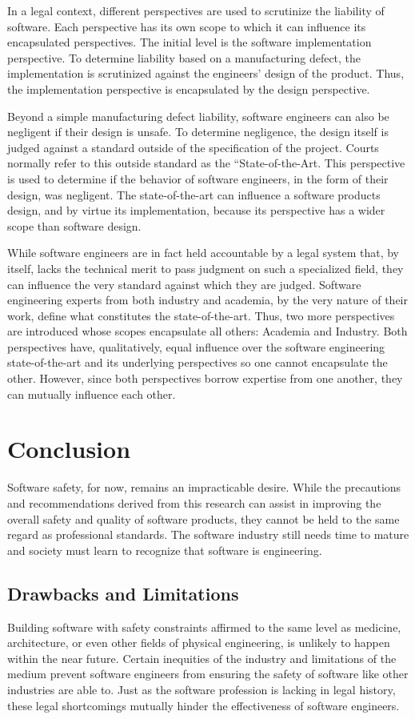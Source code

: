 \documentclass[12pt]{report}
\begin{document}
In a legal context, different perspectives are used to scrutinize the liability of software. Each perspective has its own scope to which it can influence its encapsulated perspectives. The initial level is the software implementation perspective. To determine liability based on a manufacturing defect, the implementation is scrutinized against the engineers' design of the product. Thus, the implementation perspective is encapsulated by the design perspective. 

Beyond a simple manufacturing defect liability, software engineers can also be negligent if their design is unsafe. To determine negligence, the design itself is judged against a standard outside of the specification of the project. Courts normally refer to this outside standard as the ``State-of-the-Art. This perspective is used to determine if the behavior of software engineers, in the form of their design, was negligent. The state-of-the-art can influence a software products design, and by virtue its implementation, because its perspective has a wider scope than software design. 

While software engineers are in fact held accountable by a legal system that, by itself, lacks the technical merit to pass judgment on such a specialized field, they can influence the very standard against which they are judged. Software engineering experts from both industry and academia, by the very nature of their work, define what constitutes the state-of-the-art. Thus, two more perspectives are introduced whose scopes encapsulate all others: Academia and Industry. Both perspectives have, qualitatively, equal influence over the software engineering state-of-the-art and its underlying perspectives so one cannot encapsulate the other. However, since both perspectives borrow expertise from one another, they can mutually influence each other. 

\chapter{Conclusion} 
Software safety, for now, remains an impracticable desire. While the precautions and recommendations derived from this research can assist in improving the overall safety and quality of software products, they cannot be held to the same regard as professional standards. The software industry still needs time to mature and society must learn to recognize that software is engineering. 

\section{Drawbacks and Limitations} 
Building software with safety constraints affirmed to the same level as medicine, architecture, or even other fields of physical engineering, is unlikely to happen within the near future. Certain inequities of the industry and limitations of the medium prevent software engineers from ensuring the safety of software like other industries are able to. 
Just as the software profession is lacking in legal history, these legal shortcomings mutually hinder the effectiveness of software engineers. 
\end{document}
